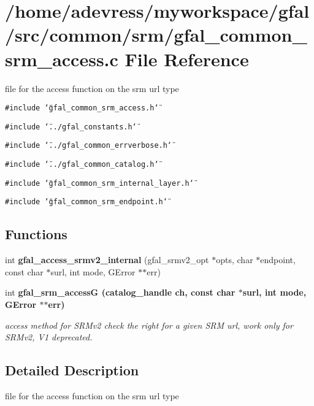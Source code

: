 \section{/home/adevress/myworkspace/gfal/src/common/srm/gfal\_\-common\_\-srm\_\-access.c File Reference}
\label{gfal__common__srm__access_8c}
file for the access function on the srm url type 

{\tt \#include \char`\"{}gfal\_\-common\_\-srm\_\-access.h\char`\"{}}\par
{\tt \#include \char`\"{}../gfal\_\-constants.h\char`\"{}}\par
{\tt \#include \char`\"{}../gfal\_\-common\_\-errverbose.h\char`\"{}}\par
{\tt \#include \char`\"{}../gfal\_\-common\_\-catalog.h\char`\"{}}\par
{\tt \#include \char`\"{}gfal\_\-common\_\-srm\_\-internal\_\-layer.h\char`\"{}}\par
{\tt \#include \char`\"{}gfal\_\-common\_\-srm\_\-endpoint.h\char`\"{}}\par
\subsection*{Functions}
\begin{CompactItemize}
\item 
int \textbf{gfal\_\-access\_\-srmv2\_\-internal} (gfal\_\-srmv2\_\-opt $\ast$opts, char $\ast$endpoint, const char $\ast$surl, int mode, GError $\ast$$\ast$err)\label{gfal__common__srm__access_8c_482394e183f4026d547f17575dc4b8dd}

\item 
int \bf{gfal\_\-srm\_\-access\-G} (catalog\_\-handle ch, const char $\ast$surl, int mode, GError $\ast$$\ast$err)
\begin{CompactList}\small\item\em access method for SRMv2 check the right for a given SRM url, work only for SRMv2, V1 deprecated. \item\end{CompactList}\end{CompactItemize}


\subsection{Detailed Description}
file for the access function on the srm url type 

